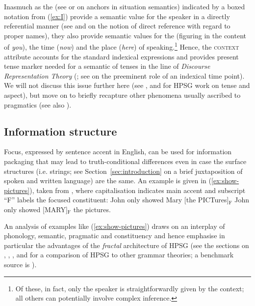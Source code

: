 \documentclass[output=paper]{langsci/langscibook}
\begin{document}
{Inasmuch as the   (see \citet{Barwise:Perry:1983} or \citet{Devlin:1991} on anchors in situation semantics) indicated by a boxed notation from (\ref{ex:I}) provide a semantic value for the speaker in a directly referential  manner (see \citet{Marcus:1961} and \citet{Kripke:1980} on the notion of direct reference with regard to proper names), they also provide semantic values for the  (figuring in the content of \textit{you}), the time (\textit{now}) and the place (\textit{here}) of speaking.\footnote{Of these, in fact, only the speaker is straightforwardly given by the context; all others can potentially involve complex inference.}
%
Hence, the \textsc{context} attribute accounts for the standard indexical expressions and provides present tense marker needed for a semantic of tenses  in the line of \emph{Discourse Representation Theory}  (\citet{Kamp:Reyle:1993}; see \citet{partee1973some} on the preeminent role of an indexical time point).
%
We will not discuss this issue further here (see \citet{Van-Eynde:1998,Van-Eynde:2000}, \citet{Bonami:2002} and \citet{Costa:Branco:2012} for HPSG work on tense and aspect), but move on to briefly recapture other phenomena usually ascribed to pragmatics (see also \citet[Sec.~5.2]{Kathol:Przepiorkowski:Tseng:2011}).
 




  
\subsection{Information structure}
\label{sec:information-structure}

Focus, expressed by sentence accent in English, can be used for information packaging that may lead to truth-conditional differences  even in case the surface structures (i.e. strings; see Section~\ref{sec:introduction} on a brief juxtaposition of spoken and written language) are the same.
%
An example is given in (\ref{ex:show-pictures}), taken from \citet[]{Krifka:2008}, where capitalisation indicates main accent and subscript \enquote{F} labels the focused constituent:
%
\ea \label{ex:show-pictures}
  \ea John only showed Mary [the PICTures]$_\text{F}$
  \ex John only showed [MARY]$_\text{F}$ the pictures.
  \z
\z


An analysis of examples like (\ref{ex:show-pictures}) draws on an interplay of phonology, semantic, pragmatic and constituency and hence emphasise in particular the advantages of the \emph{fractal} \citep{Johnson:Lappin:1999} architecture   of HPSG (see the sections on , , ,  and  for a comparison of HPSG to other grammar theories; a benchmark source is \citealp{Mueller:2016}).


}
\end{document}
